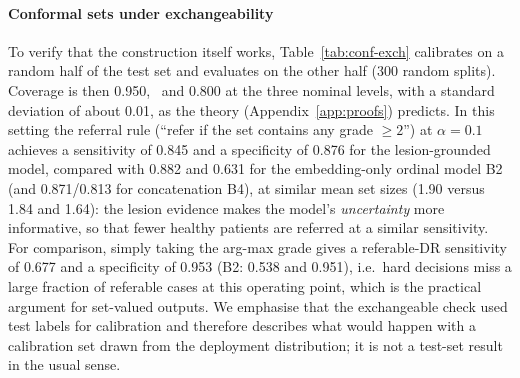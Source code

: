 \paragraph{Conformal sets under exchangeability} To verify that the construction itself works, Table~\ref{tab:conf-exch} calibrates on a random half of the test set and evaluates on the other half (300 random splits). Coverage is then 0.950, \nExchCovTen\ and 0.800 at the three nominal levels, with a standard deviation of about 0.01, as the theory (Appendix~\ref{app:proofs}) predicts. In this setting the referral rule (``refer if the set contains any grade $\ge2$'') at $\alpha=0.1$ achieves a sensitivity of 0.845 and a specificity of 0.876 for the lesion-grounded model, compared with 0.882 and 0.631 for the embedding-only ordinal model B2 (and 0.871/0.813 for concatenation B4), at similar mean set sizes (1.90 versus 1.84 and 1.64): the lesion evidence makes the model's \emph{uncertainty} more informative, so that fewer healthy patients are referred at a similar sensitivity. For comparison, simply taking the arg-max grade gives a referable-DR sensitivity of 0.677 and a specificity of 0.953 (B2: 0.538 and 0.951), i.e.\ hard decisions miss a large fraction of referable cases at this operating point, which is the practical argument for set-valued outputs. We emphasise that the exchangeable check used test labels for calibration and therefore describes what would happen with a calibration set drawn from the deployment distribution; it is not a test-set result in the usual sense.





